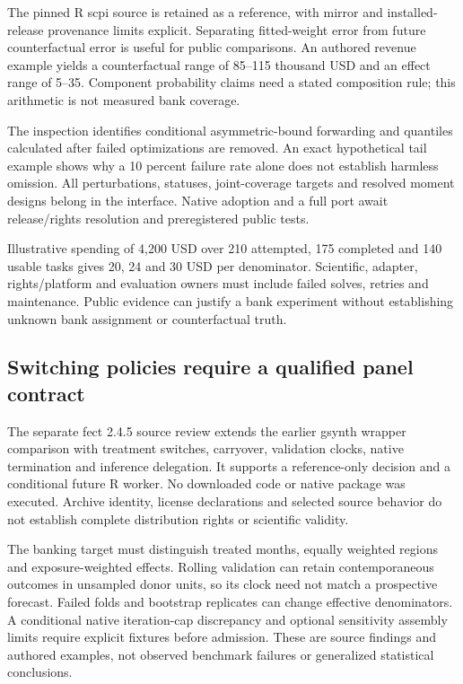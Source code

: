 The pinned R scpi source is retained as a reference, with mirror and
installed-release provenance limits explicit. Separating fitted-weight
error from future counterfactual error is useful for public comparisons.
An authored revenue example yields a counterfactual range of 85--115
thousand USD and an effect range of 5--35. Component probability claims
need a stated composition rule; this arithmetic is not measured bank
coverage. \citep{exec24_scpi_source,exec24_scpi_choice}

The inspection identifies conditional asymmetric-bound forwarding and
quantiles calculated after failed optimizations are removed. An exact
hypothetical tail example shows why a 10 percent failure rate alone does
not establish harmless omission. All perturbations, statuses,
joint-coverage targets and resolved moment designs belong in the
interface. Native adoption and a full port await release/rights
resolution and preregistered public tests.
\citep{exec24_scpi_source,exec24_scpi_choice}

Illustrative spending of 4,200 USD over 210 attempted, 175 completed and
140 usable tasks gives 20, 24 and 30 USD per denominator. Scientific,
adapter, rights/platform and evaluation owners must include failed
solves, retries and maintenance. Public evidence can justify a bank
experiment without establishing unknown bank assignment or
counterfactual truth. \citep{exec24_scpi_choice}

\hypertarget{switching-policies-require-a-qualified-panel-contract}{%
\subsection{Switching policies require a qualified panel
contract}\label{switching-policies-require-a-qualified-panel-contract}}

The separate fect 2.4.5 source review extends the earlier gsynth wrapper
comparison with treatment switches, carryover, validation clocks, native
termination and inference delegation. It supports a reference-only
decision and a conditional future R worker. No downloaded code or native
package was executed. Archive identity, license declarations and
selected source behavior do not establish complete distribution rights
or scientific validity. \citep{exec24_fect_source,exec24_fect_choice}

The banking target must distinguish treated months, equally weighted
regions and exposure-weighted effects. Rolling validation can retain
contemporaneous outcomes in unsampled donor units, so its clock need not
match a prospective forecast. Failed folds and bootstrap replicates can
change effective denominators. A conditional native iteration-cap
discrepancy and optional sensitivity assembly limits require explicit
fixtures before admission. These are source findings and authored
examples, not observed benchmark failures or generalized statistical
conclusions. \citep{exec24_fect_source,exec24_fect_choice}

